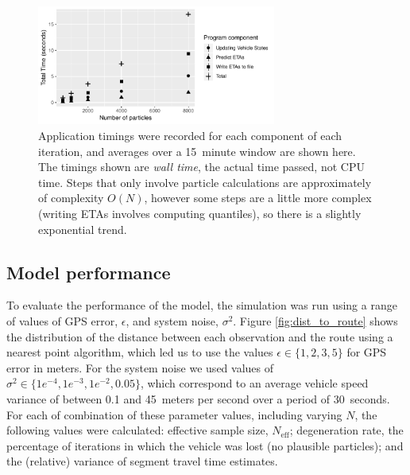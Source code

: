 \begin{figure}[tb]
    \centering
    \includegraphics[width=0.7\textwidth]{figures/04_model_results_timing.pdf}
    \caption{
        Application timings were recorded for each component of each
        iteration, and averages over a 15~minute window are shown here.
        The timings shown are \emph{wall time}, the actual time passed,
        not CPU time.
        Steps that only involve particle calculations are approximately
        of complexity $O(N)$,
        however some steps are a little more complex (writing ETAs involves computing quantiles), 
        so there is a slightly exponential trend.
    }
    \label{fig:timings}
\end{figure}




\subsection{Model performance}
\label{sec:model_perf}


To evaluate the performance of the model,
the simulation was run using a range of values of GPS error, $\epsilon$,
and system noise, $\sigma^2$.
Figure \ref{fig:dist_to_route} shows the distribution of the distance
between each observation and the route using a nearest point algorithm,
which led us to use the values $\epsilon \in \{1,2,3,5\}$ for GPS error in meters.
For the system noise we used values of $\sigma^2\in \{1e^{-4},1e^{-3},1e^{-2},0.05\}$,
which correspond to an average vehicle speed variance of between 0.1 and 45~meters per second
over a period of 30~seconds.
For each of combination of these parameter values, including varying $N$,
the following values were calculated:
effective sample size, $N_\text{eff}$;
degeneration rate, the percentage of iterations in which the vehicle was lost
(no plausible particles);
and the (relative) variance of segment travel time estimates.



